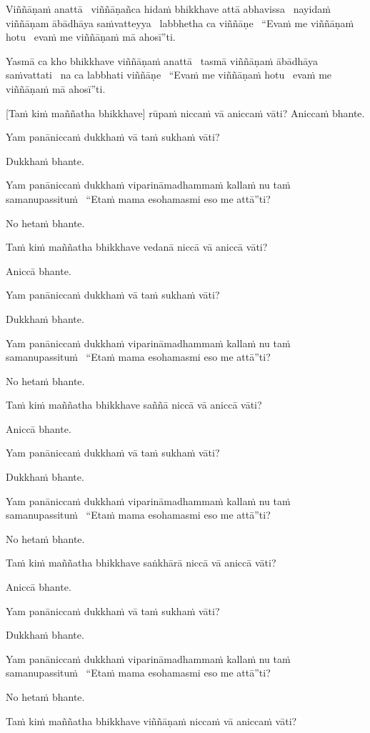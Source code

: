 Viññāṇaṁ anattā \breathmark\ viññāṇañca hidaṁ bhikkhave attā abhavissa \breathmark\ nayidaṁ viññāṇam ābādhāya saṁvatteyya \breathmark\ labbhetha ca viññāṇe \breathmark\ ``Evaṁ me viññāṇaṁ hotu \breathmark\ evaṁ me viññāṇaṁ mā ahosī''ti.

Yasmā ca kho bhikkhave viññāṇaṁ anattā \breathmark\ tasmā viññāṇaṁ ābādhāya saṁvattati \breathmark\ na ca labbhati viññāṇe \breathmark\ ``Evaṁ me viññāṇaṁ hotu \breathmark\ evaṁ me viññāṇaṁ mā ahosī''ti.

[Taṁ kiṁ maññatha bhikkhave] rūpaṁ niccaṁ vā aniccaṁ vāti? Aniccaṁ bhante.

Yam panāniccaṁ dukkhaṁ vā taṁ sukhaṁ vāti?

Dukkhaṁ bhante.

Yam panāniccaṁ dukkhaṁ viparināmadhammaṁ kallaṁ nu taṁ samanupassituṁ \breathmark\ ``Etaṁ mama esohamasmi eso me attā''ti?

No hetaṁ bhante.

Taṁ kiṁ maññatha bhikkhave vedanā niccā vā aniccā vāti?

Aniccā bhante.

Yam panāniccaṁ dukkhaṁ vā taṁ sukhaṁ vāti?

Dukkhaṁ bhante.

Yam panāniccaṁ dukkhaṁ viparināmadhammaṁ kallaṁ nu taṁ samanupassituṁ \breathmark\ ``Etaṁ mama esohamasmi eso me attā''ti?

No hetaṁ bhante.

Taṁ kiṁ maññatha bhikkhave saññā niccā vā aniccā vāti?

Aniccā bhante.

Yam panāniccaṁ dukkhaṁ vā taṁ sukhaṁ vāti?

Dukkhaṁ bhante.

Yam panāniccaṁ dukkhaṁ viparināmadhammaṁ kallaṁ nu taṁ samanupassituṁ \breathmark\ ``Etaṁ mama esohamasmi eso me attā''ti?

No hetaṁ bhante.

Taṁ kiṁ maññatha bhikkhave saṅkhārā niccā vā aniccā vāti?

Aniccā bhante.

Yam panāniccaṁ dukkhaṁ vā taṁ sukhaṁ vāti?

Dukkhaṁ bhante.

Yam panāniccaṁ dukkhaṁ viparināmadhammaṁ kallaṁ nu taṁ samanupassituṁ \breathmark\ ``Etaṁ mama esohamasmi eso me attā''ti?

No hetaṁ bhante.

Taṁ kiṁ maññatha bhikkhave viññāṇaṁ niccaṁ vā aniccaṁ vāti?

